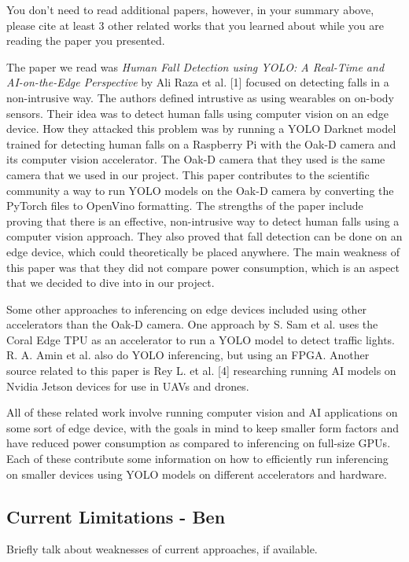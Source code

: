 \documentclass[sigconf,authorversion,nonacm]{acmart}
\begin{document}
You don't need to read additional papers, however, in your summary above, please cite at least 3 other related works that you learned about while you are reading the paper you presented. 

The paper we read was \textit{Human Fall Detection using YOLO: A Real{-}Time and AI{-}on{-}the{-}Edge Perspective} by Ali Raza et al. [1] focused on detecting falls in a non-intrusive way. The authors defined intrustive as using wearables on on-body sensors. Their idea was to detect human falls using computer vision on an edge device. How they attacked this problem was by running a YOLO Darknet model trained for detecting human falls on a Raspberry Pi with the Oak-D camera and its computer vision accelerator. The Oak-D camera that they used is the same camera that we used in our project. This paper contributes to the scientific community a way to run YOLO models on the Oak-D camera by converting the PyTorch files to OpenVino formatting. The strengths of the paper include proving that there is an effective, non-intrusive way to detect human falls using a computer vision approach. They also proved that fall detection can be done on an edge device, which could theoretically be placed anywhere. The main weakness of this paper was that they did not compare power consumption, which is an aspect that we decided to dive into in our project.

Some other approaches to inferencing on edge devices included using other accelerators than the Oak-D camera. One approach by S. Sam et al. uses the Coral Edge TPU as an accelerator to run a YOLO model to detect traffic lights. R. A. Amin et al. also do YOLO inferencing, but using an FPGA. Another source related to this paper is Rey L. et al. [4] researching running AI models on Nvidia Jetson devices for use in UAVs and drones.

All of these related work involve running computer vision and AI applications on some sort of edge device, with the goals in mind to keep smaller form factors and have reduced power consumption as compared to inferencing on full-size GPUs. Each of these contribute some information on how to efficiently run inferencing on smaller devices using YOLO models on different accelerators and hardware.

\subsection{Current Limitations - Ben}
Briefly talk about weaknesses of current approaches, if available. 
\end{document}

